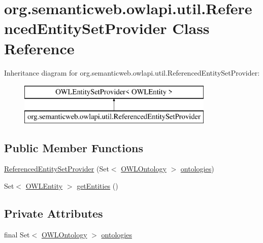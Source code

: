 \hypertarget{classorg_1_1semanticweb_1_1owlapi_1_1util_1_1_referenced_entity_set_provider}{\section{org.\-semanticweb.\-owlapi.\-util.\-Referenced\-Entity\-Set\-Provider Class Reference}
\label{classorg_1_1semanticweb_1_1owlapi_1_1util_1_1_referenced_entity_set_provider}
}
Inheritance diagram for org.\-semanticweb.\-owlapi.\-util.\-Referenced\-Entity\-Set\-Provider\-:\begin{figure}[H]
\begin{center}
\leavevmode
\includegraphics[height=2.000000cm]{classorg_1_1semanticweb_1_1owlapi_1_1util_1_1_referenced_entity_set_provider}
\end{center}
\end{figure}
\subsection*{Public Member Functions}
\begin{DoxyCompactItemize}
\item 
\hyperlink{classorg_1_1semanticweb_1_1owlapi_1_1util_1_1_referenced_entity_set_provider_aea3aff3f9e9799b308959c0e92e13517}{Referenced\-Entity\-Set\-Provider} (Set$<$ \hyperlink{interfaceorg_1_1semanticweb_1_1owlapi_1_1model_1_1_o_w_l_ontology}{O\-W\-L\-Ontology} $>$ \hyperlink{classorg_1_1semanticweb_1_1owlapi_1_1util_1_1_referenced_entity_set_provider_afd558121a86db510d0f538de6f156b36}{ontologies})
\item 
Set$<$ \hyperlink{interfaceorg_1_1semanticweb_1_1owlapi_1_1model_1_1_o_w_l_entity}{O\-W\-L\-Entity} $>$ \hyperlink{classorg_1_1semanticweb_1_1owlapi_1_1util_1_1_referenced_entity_set_provider_a0b88fdbc347151f1f346b2a46ed39a1c}{get\-Entities} ()
\end{DoxyCompactItemize}
\subsection*{Private Attributes}
\begin{DoxyCompactItemize}
\item 
final Set$<$ \hyperlink{interfaceorg_1_1semanticweb_1_1owlapi_1_1model_1_1_o_w_l_ontology}{O\-W\-L\-Ontology} $>$ \hyperlink{classorg_1_1semanticweb_1_1owlapi_1_1util_1_1_referenced_entity_set_provider_afd558121a86db510d0f538de6f156b36}{ontologies}
\end{DoxyCompactItemize}


